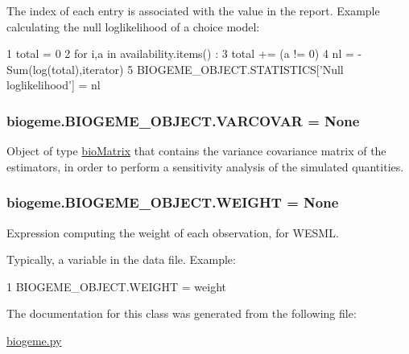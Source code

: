 The index of each entry is associated with the value in the report. Example calculating the null loglikelihood of a choice model\+: 
\begin{DoxyCode}
1 total = 0 
2 \textcolor{keywordflow}{for} i,a \textcolor{keywordflow}{in} availability.items() :
3     total += (a != 0)
4 nl = -Sum(log(total),iterator)
5 BIOGEME\_OBJECT.STATISTICS[\textcolor{stringliteral}{'Null loglikelihood'}] = nl
\end{DoxyCode}
 \hypertarget{classbiogeme_1_1_b_i_o_g_e_m_e___o_b_j_e_c_t_ad9fc8223d62db27a51cd10f55b796ea0}{
\subsubsection[{V\+A\+R\+C\+O\+V\+A\+R}]{\setlength{\rightskip}{0pt plus 5cm}biogeme.\+B\+I\+O\+G\+E\+M\+E\+\_\+\+O\+B\+J\+E\+C\+T.\+V\+A\+R\+C\+O\+V\+A\+R = None\hspace{0.3cm}{\ttfamily [static]}}}\label{classbiogeme_1_1_b_i_o_g_e_m_e___o_b_j_e_c_t_ad9fc8223d62db27a51cd10f55b796ea0}


Object of type \hyperlink{namespacebio_matrix}{bio\+Matrix} that contains the variance covariance matrix of the estimators, in order to perform a sensitivity analysis of the simulated quantities. 

\hypertarget{classbiogeme_1_1_b_i_o_g_e_m_e___o_b_j_e_c_t_a2a9babe593d7115e3bfd57057ab9c97e}{
\subsubsection[{W\+E\+I\+G\+H\+T}]{\setlength{\rightskip}{0pt plus 5cm}biogeme.\+B\+I\+O\+G\+E\+M\+E\+\_\+\+O\+B\+J\+E\+C\+T.\+W\+E\+I\+G\+H\+T = None\hspace{0.3cm}{\ttfamily [static]}}}\label{classbiogeme_1_1_b_i_o_g_e_m_e___o_b_j_e_c_t_a2a9babe593d7115e3bfd57057ab9c97e}


Expression computing the weight of each observation, for W\+E\+S\+M\+L. 

Typically, a variable in the data file. Example\+:
\begin{DoxyCode}
1 BIOGEME\_OBJECT.WEIGHT = weight 
\end{DoxyCode}
 

The documentation for this class was generated from the following file\+:\begin{DoxyCompactItemize}
\item 
\hyperlink{biogeme_8py}{biogeme.\+py}\end{DoxyCompactItemize}
